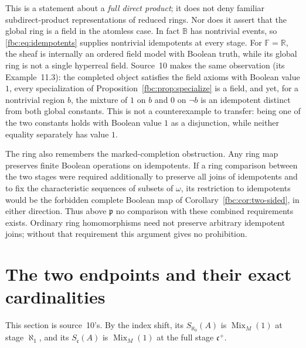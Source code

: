 \documentclass[11pt,letterpaper]{article}
\theoremstyle{definition}
\theoremstyle{remark}
\newcommand{\om}{\omega}
\newcommand{\B}{\mathbb B}
\newcommand{\cp}{\mathfrak p}
\newcommand{\cc}{\mathfrak c}
\newcommand{\Mix}{\operatorname{Mix}}
\newcommand{\Fd}{\mathbb F}
\begin{document}
This is a statement about a \emph{full direct product}; it does
not deny familiar subdirect-product representations of reduced
rings. Nor does it assert that the global ring is a field in the
atomless case. In fact $\B$ has nontrivial events, so
\eqref{fbc:eq:idempotents} supplies nontrivial idempotents at every
stage. For $\Fd=\mathbb R$, the sheaf is internally an ordered field
model with Boolean truth, while its global ring is not a single
hyperreal field. Source~10 makes the same observation (its
Example~11.3): the completed object satisfies the field axioms with
Boolean value $1$, every specialization of
Proposition~\ref{fbc:prop:specialize} is a field, and yet, for a
nontrivial region $b$, the mixture of $1$ on $b$ and $0$ on $\neg b$ is
an idempotent distinct from both global constants. This is not a
counterexample to transfer: being one of the two constants holds with
Boolean value $1$ as a disjunction, while neither equality separately
has value $1$.

The ring also remembers the marked-completion obstruction. Any ring
map preserves finite Boolean operations on idempotents. If a ring
comparison between the two stages were required additionally to
preserve all joins of idempotents and to fix the characteristic
sequences of subsets of $\om$, its restriction to idempotents would
be the forbidden complete Boolean map of
Corollary~\ref{fbc:cor:two-sided}, in either direction. Thus above $\cp$
no comparison with these combined requirements exists. Ordinary ring
homomorphisms need not preserve arbitrary idempotent joins; without that
requirement this argument gives no prohibition.

\section{The two endpoints and their exact cardinalities}
\label{fbc:sec:sizes}

This section is source~10's. By the index shift, its $S_{\aleph_0}(A)$ is
$\Mix_M(1)$ at stage $\aleph_1$, and its $S_\cc(A)$ is $\Mix_M(1)$ at the
full stage $\cc^+$.
\end{document}
